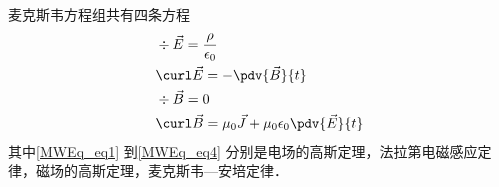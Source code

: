 
麦克斯韦方程组共有四条方程
\begin{align}
\label{MWEq_eq1}
&\div \vec E = \frac{\rho}{\epsilon_0}\\
\label{MWEq_eq2}
&\curl \vec E = -\pdv{\vec B}{t}\\
\label{MWEq_eq3}
&\div \vec B = 0 \\
\label{MWEq_eq4}
&\curl \vec B = \mu_0 \vec J + \mu_0\epsilon_0 \pdv{\vec E}{t}
\end{align}
其中\autoref{MWEq_eq1} 到\autoref{MWEq_eq4} 分别是电场的高斯定理，法拉第电磁感应定律，磁场的高斯定理，麦克斯韦—安培定律．%
